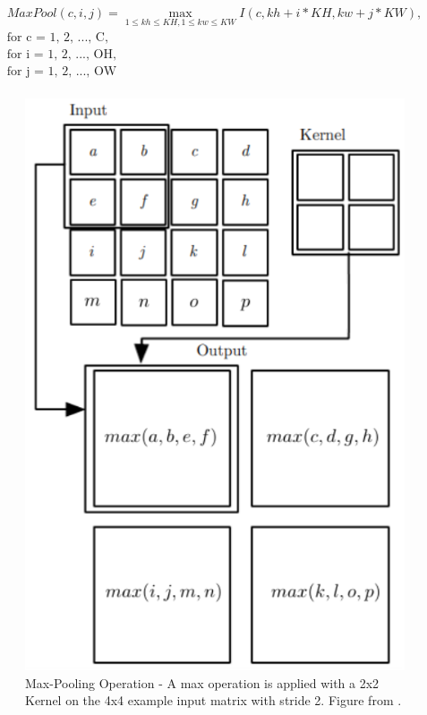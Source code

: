 \begin{equation}
	\label{eqn:max-pooling}
	\begin{split}
		MaxPool(c, i, j) = \max_{1 \leq kh \leq KH, 1 \leq kw \leq KW}
		I(c, kh + i * KH, kw + j * KW),\\
		\mbox{for c = 1, 2, ..., C},\\
		\mbox{for i = 1, 2, ..., OH},\\
		\mbox{for j = 1, 2, ..., OW}\\
	\end{split}
\end{equation}

\begin{figure} [H]
	\centering
	\includegraphics[scale=0.6]{Images/CNNArchitectures/maxpooling-operation.png}
	\decoRule
	\caption[Max-Pooling Operation]{Max-Pooling Operation - A max operation is applied with a 2x2 Kernel on the 4x4 example input matrix with stride 2. Figure from \cite{Goodfellow-et-al-2016}.}
	\label{fig:max-pooling-operation}
\end{figure}

